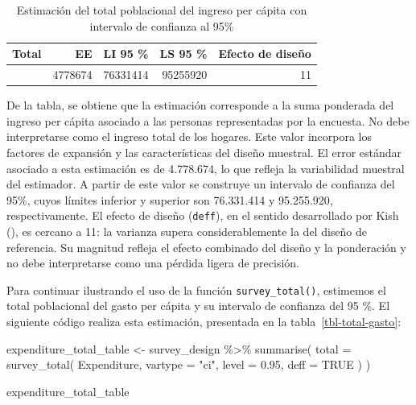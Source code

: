 \documentclass[
  spanish,
  11pt,
  letterpaper,
  oneside,
  open=any]{scrbook}
\newenvironment{Shaded}{\begin{snugshade}}{\end{snugshade}}
\newcommand{\AttributeTok}[1]{\textcolor[rgb]{0.40,0.45,0.13}{#1}}
\newcommand{\ConstantTok}[1]{\textcolor[rgb]{0.56,0.35,0.01}{#1}}
\newcommand{\FloatTok}[1]{\textcolor[rgb]{0.68,0.00,0.00}{#1}}
\newcommand{\FunctionTok}[1]{\textcolor[rgb]{0.28,0.35,0.67}{#1}}
\newcommand{\NormalTok}[1]{\textcolor[rgb]{0.00,0.23,0.31}{#1}}
\newcommand{\OtherTok}[1]{\textcolor[rgb]{0.00,0.23,0.31}{#1}}
\newcommand{\SpecialCharTok}[1]{\textcolor[rgb]{0.37,0.37,0.37}{#1}}
\newcommand{\StringTok}[1]{\textcolor[rgb]{0.13,0.47,0.30}{#1}}
\begin{document}
{

\begin{longtable}[]{@{}rrrrr@{}}

\caption{\label{tbl-total-ingreso}Estimación del total poblacional del
ingreso per cápita con intervalo de confianza al 95\%}

\tabularnewline

\toprule\noalign{}
Total & EE & LI 95 \% & LS 95 \% & Efecto de diseño \\
\midrule\noalign{}
\endhead
\bottomrule\noalign{}
\endlastfoot
85793667 & 4778674 & 76331414 & 95255920 & 11 \\

\end{longtable}

}

De la tabla, se obtiene que la estimación corresponde a la suma
ponderada del ingreso per cápita asociado a las personas representadas
por la encuesta. No debe interpretarse como el ingreso total de los
hogares. Este valor incorpora los factores de expansión y las
características del diseño muestral. El error estándar asociado a esta
estimación es de 4.778.674, lo que refleja la variabilidad muestral del
estimador. A partir de este valor se construye un intervalo de confianza
del 95\%, cuyos límites inferior y superior son 76.331.414 y 95.255.920,
respectivamente. El efecto de diseño (\texttt{deff}), en el sentido
desarrollado por Kish (), es cercano
a 11: la varianza supera considerablemente la del diseño de referencia.
Su magnitud refleja el efecto combinado del diseño y la ponderación y no
debe interpretarse como una pérdida ligera de precisión.

Para continuar ilustrando el uso de la función \texttt{survey\_total()},
estimemos el total poblacional del gasto per cápita y su intervalo de
confianza del 95 \%. El siguiente código realiza esta estimación,
presentada en la tabla~\ref{tbl-total-gasto}:

\begin{Shaded}
\begin{Highlighting}[]
\NormalTok{expenditure\_total\_table }\OtherTok{\textless{}{-}}\NormalTok{ survey\_design }\SpecialCharTok{\%\textgreater{}\%}
  \FunctionTok{summarise}\NormalTok{(}
    \AttributeTok{total =} \FunctionTok{survey\_total}\NormalTok{(}
\NormalTok{      Expenditure,}
      \AttributeTok{vartype =} \StringTok{"ci"}\NormalTok{,}
      \AttributeTok{level =} \FloatTok{0.95}\NormalTok{,}
      \AttributeTok{deff =} \ConstantTok{TRUE}
\NormalTok{    )}
\NormalTok{  )}

\NormalTok{expenditure\_total\_table}
\end{Highlighting}
\end{Shaded}
\end{document}
